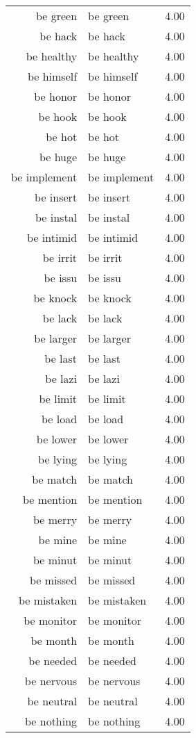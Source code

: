 \begin{table}[ht]
\begin{tabular}{rlr}
  be green & be green & 4.00 \\ 
  be hack & be hack & 4.00 \\ 
  be healthy & be healthy & 4.00 \\ 
  be himself & be himself & 4.00 \\ 
  be honor & be honor & 4.00 \\ 
  be hook & be hook & 4.00 \\ 
  be hot & be hot & 4.00 \\ 
  be huge & be huge & 4.00 \\ 
  be implement & be implement & 4.00 \\ 
  be insert & be insert & 4.00 \\ 
  be instal & be instal & 4.00 \\ 
  be intimid & be intimid & 4.00 \\ 
  be irrit & be irrit & 4.00 \\ 
  be issu & be issu & 4.00 \\ 
  be knock & be knock & 4.00 \\ 
  be lack & be lack & 4.00 \\ 
  be larger & be larger & 4.00 \\ 
  be last & be last & 4.00 \\ 
  be lazi & be lazi & 4.00 \\ 
  be limit & be limit & 4.00 \\ 
  be load & be load & 4.00 \\ 
  be lower & be lower & 4.00 \\ 
  be lying & be lying & 4.00 \\ 
  be match & be match & 4.00 \\ 
  be mention & be mention & 4.00 \\ 
  be merry & be merry & 4.00 \\ 
  be mine & be mine & 4.00 \\ 
  be minut & be minut & 4.00 \\ 
  be missed & be missed & 4.00 \\ 
  be mistaken & be mistaken & 4.00 \\ 
  be monitor & be monitor & 4.00 \\ 
  be month & be month & 4.00 \\ 
  be needed & be needed & 4.00 \\ 
  be nervous & be nervous & 4.00 \\ 
  be neutral & be neutral & 4.00 \\ 
  be nothing & be nothing & 4.00 \\ 

\end{tabular}
\end{table}
